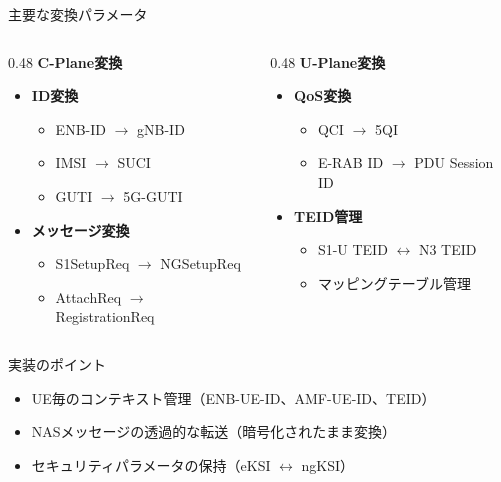 \documentclass[dvipdfmx,11pt,aspectratio=169]{beamer}
\begin{document}
\begin{frame}{主要な変換パラメータ}
  \begin{columns}[T]
    \begin{column}{0.48\textwidth}
      \textbf{C-Plane変換}
      \begin{itemize}
        \item \textbf{ID変換}
          \begin{itemize}
            \item ENB-ID $\rightarrow$ gNB-ID
            \item IMSI $\rightarrow$ SUCI
            \item GUTI $\rightarrow$ 5G-GUTI
          \end{itemize}
        \item \textbf{メッセージ変換}
          \begin{itemize}
            \item S1SetupReq $\rightarrow$ NGSetupReq
            \item AttachReq $\rightarrow$ RegistrationReq
          \end{itemize}
      \end{itemize}
    \end{column}
    \begin{column}{0.48\textwidth}
      \textbf{U-Plane変換}
      \begin{itemize}
        \item \textbf{QoS変換}
          \begin{itemize}
            \item QCI $\rightarrow$ 5QI
            \item E-RAB ID $\rightarrow$ PDU Session ID
          \end{itemize}
        \item \textbf{TEID管理}
          \begin{itemize}
            \item S1-U TEID $\leftrightarrow$ N3 TEID
            \item マッピングテーブル管理
          \end{itemize}
      \end{itemize}
    \end{column}
  \end{columns}

  \vspace{0.5cm}
  \begin{block}{実装のポイント}
    \begin{itemize}
      \item UE毎のコンテキスト管理（ENB-UE-ID、AMF-UE-ID、TEID）
      \item NASメッセージの透過的な転送（暗号化されたまま変換）
      \item セキュリティパラメータの保持（eKSI $\leftrightarrow$ ngKSI）
    \end{itemize}
  \end{block}
\end{frame}
\end{document}

